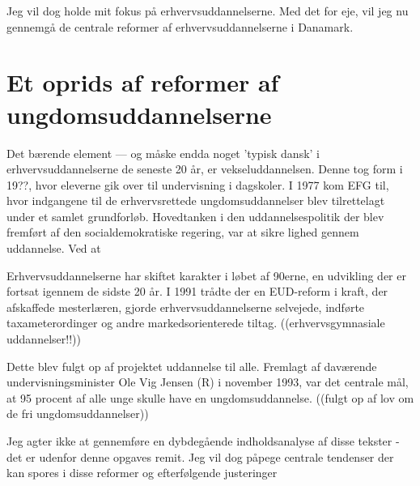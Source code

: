 Jeg vil dog holde mit fokus på erhvervsuddannelserne.
Med det for eje, vil jeg nu gennemgå de centrale reformer af erhvervsuddannelserne i Danamark.
\chapter{Et oprids af reformer af ungdomsuddannelserne}
Det bærende element --- og måske endda noget 'typisk dansk' i erhvervsuddannelserne de seneste 20 år, er vekseluddannelsen.
Denne tog form i 19??, hvor eleverne gik over til undervisning i dagskoler.
I 1977 kom EFG til, hvor indgangene til de erhvervsrettede ungdomsuddannelser blev tilrettelagt under et samlet grundforløb.
Hovedtanken i den uddannelsespolitik der blev fremført af den socialdemokratiske regering, var at sikre lighed gennem uddannelse.
Ved at 

Erhvervsuddannelserne har skiftet karakter i løbet af 90erne, en udvikling der er fortsat igennem de sidste 20 år.
I 1991 trådte der en EUD-reform i kraft, der afskaffede mesterlæren, gjorde erhvervsuddannelserne selvejede, indførte taxameterordinger og andre markedsorienterede tiltag.
((erhvervsgymnasiale uddannelser!!))


Dette blev fulgt op af projektet uddannelse til alle.
Fremlagt af daværende undervisningsminister Ole Vig Jensen (R) i november 1993, var det centrale mål, at 95 procent af alle unge skulle have en ungdomsuddannelse.
((fulgt op af lov om de fri ungdomsuddannelser))

Jeg agter ikke at gennemføre en dybdegående indholdsanalyse af disse tekster - det er udenfor denne opgaves remit.
Jeg vil dog påpege centrale tendenser der kan spores i disse reformer og efterfølgende justeringer
